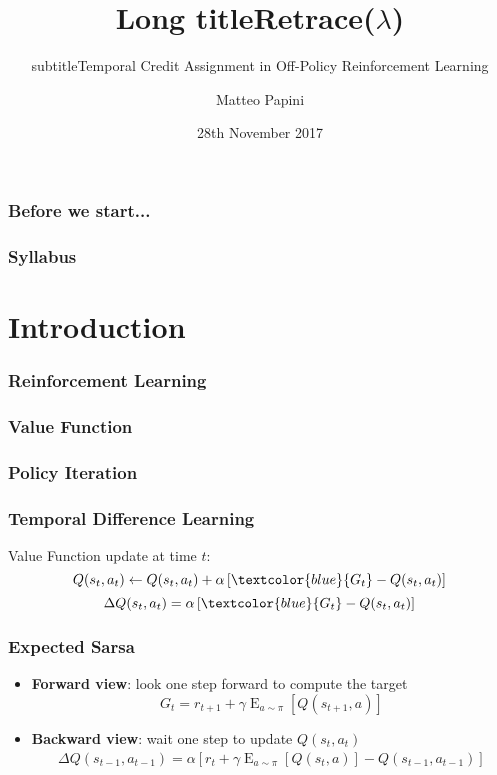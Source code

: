 \documentclass{beamer}
\title[Short title]{Long title}
\subtitle{subtitle}
\title[Retrace]{Retrace($\lambda$)}
\subtitle{Temporal Credit Assignment in Off-Policy Reinforcement Learning}
\author[Matteo Papini]{Matteo Papini}
\date[28/11/17]{28th November 2017}
\newcommand{\expect}[2]{\mathop{E}_{#1}\left[#2\right]}
\begin{document}

\begin{frame}
\titlepage
\end{frame}

\addtocounter{framenumber}{-1}


\begin{frame}
\frametitle{Before we start...}
\end{frame}

\begin{frame}
\frametitle{Syllabus}
\tableofcontents
\end{frame}

\section{Introduction}
\frame{\tableofcontents[currentsection]}

\begin{frame}
\frametitle{Reinforcement Learning}
\end{frame}

\begin{frame}
\frametitle{Value Function}
\end{frame}

\begin{frame}
\frametitle{Policy Iteration}
\end{frame}

\begin{frame}
\frametitle{Temporal Difference Learning}
Value Function update at time $t$:
\[
	Q(s_t,a_t) \gets Q(s_t,a_t) + \alpha\left[\textcolor{blue}{G_t} - Q(s_t,a_t)\right] 
\]
\[
	\Delta Q(s_t,a_t) = \alpha\left[\textcolor{blue}{G_t} - Q(s_t,a_t)\right]
\]
\end{frame}

\begin{frame}
\frametitle{Expected Sarsa}
\begin{itemize}
\item \textbf{Forward view}: look one step forward to compute the target
\[
	G_t = r_{t+1} + \gamma\expect{a\sim\pi}{Q(s_{t+1},a)}
\]
\item \textbf{Backward view}: wait one step to update $Q(s_t,a_t)$
\begin{align*}
	\Delta Q(s_{t-1},a_{t-1}) = \alpha\left[r_t + \gamma\expect{a\sim\pi}{Q(s_t,a)} - Q(s_{t-1},a_{t-1})\right] 
\end{align*}

\end{itemize}
\end{frame}
\end{document}
